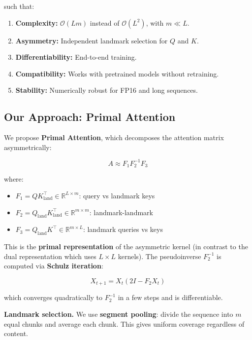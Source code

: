 such that:

\begin{enumerate}
\item \textbf{Complexity:} $\mathcal{O}(L m)$ instead of $\mathcal{O}(L^2)$, with $m \ll L$.
\item \textbf{Asymmetry:} Independent landmark selection for $Q$ and $K$.
\item \textbf{Differentiability:} End-to-end training.
\item \textbf{Compatibility:} Works with pretrained models without retraining.
\item \textbf{Stability:} Numerically robust for FP16 and long sequences.

\end{enumerate}
\subsection{Our Approach: Primal Attention}

We propose \textbf{Primal Attention}, which decomposes the attention matrix 
asymmetrically:

\begin{equation}
A \approx F_1 F_2^{-1} F_3
\end{equation}

where:

\begin{itemize}
\item $F_1 = Q K_\text{land}^\top \in \mathbb{R}^{L \times m}$: query vs landmark keys
\item $F_2 = Q_\text{land} K_\text{land}^\top \in \mathbb{R}^{m \times m}$: landmark-landmark
\item $F_3 = Q_\text{land} K^\top \in \mathbb{R}^{m \times L}$: landmark queries vs keys

\end{itemize}
This is the \textbf{primal representation} of the asymmetric kernel (in contrast 
to the dual representation which uses $L \times L$ kernels). The pseudoinverse 
$F_2^{-1}$ is computed via \textbf{Schulz iteration}:

\begin{equation}
X_{t+1} = X_t (2I - F_2 X_t)
\end{equation}

which converges quadratically to $F_2^{-1}$ in a few steps and is differentiable.

\textbf{Landmark selection.} We use \textbf{segment pooling}: divide the sequence into 
$m$ equal chunks and average each chunk. This gives uniform coverage 
regardless of content.

